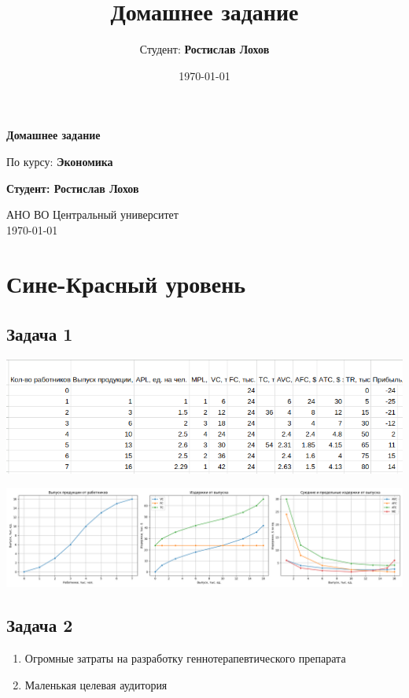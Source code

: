 \documentclass[a4paper,12pt]{article}
\title{Домашнее задание}
\author{Студент: \textbf{Ростислав Лохов}}
\date{\today}
\begin{document}
\begin{titlepage}
    \centering
    \vspace*{1cm}

    \Huge
    \textbf{Домашнее задание}

    \vspace{0.5cm}
    \LARGE
    По курсу: \textbf{Экономика}

    \vspace{1.5cm}

    \textbf{Студент: Ростислав Лохов}

    \vfill

    \Large
    АНО ВО Центральный университет\\
    \vspace{0.3cm}
    \today

\end{titlepage}

\tableofcontents
\newpage

\section{Сине-Красный уровень}


\subsection{Задача 1}

\includegraphics[scale=0.4]{graphs/5.1.png}

\includegraphics[scale=0.3]{graphs/5.2.png}


\subsection{Задача 2}
\begin{enumerate}
    \item Огромные затраты на разработку геннотерапевтического препарата
    \item Маленькая целевая аудитория 
\end{enumerate}
\end{document}
